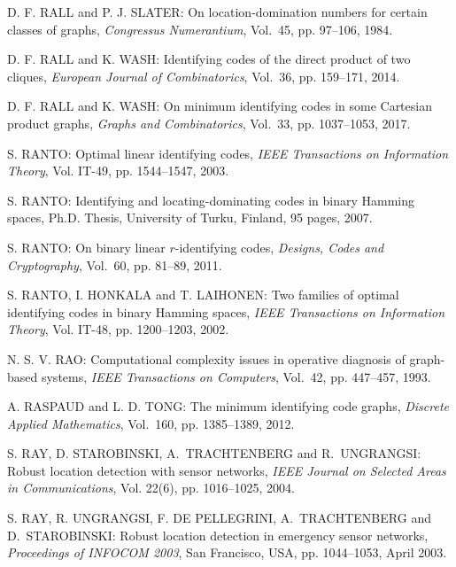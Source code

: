 \begin{thebibliography}{999}
D. F. RALL and P. J. SLATER: On location-domination numbers for certain classes of graphs, {\it Congressus Numerantium}, Vol.~45, pp. 97--106, 1984.

D. F. RALL and K. WASH: Identifying codes of the direct product of two cliques, {\it European Journal of Combinatorics}, Vol.~36, pp. 159--171, 2014.

D. F. RALL and K. WASH: On minimum identifying codes in some Cartesian product graphs, {\it Graphs and Combinatorics}, Vol.~33, pp. 1037--1053, 2017.

S. RANTO: Optimal linear identifying codes, {\it IEEE Transactions on Information Theory}, Vol. IT-49, pp. 1544--1547, 2003.

S. RANTO: Identifying and locating-dominating codes in binary Hamming spaces, Ph.D. Thesis, University of Turku, Finland, 95 pages, 2007.

S. RANTO: On binary linear $r$-identifying codes, {\it Designs, Codes and Cryptography}, Vol.~60, pp. 81--89, 2011.

S. RANTO, I. HONKALA and T. LAIHONEN: Two families of optimal identifying codes in binary Hamming spaces, {\it IEEE Transactions on Information Theory}, Vol. IT-48, pp. 1200--1203, 2002. 

N. S. V. RAO: Computational complexity issues in operative diagnosis of graph-based systems, {\it IEEE Transactions on Computers}, Vol.~42, pp. 447--457, 1993.

A. RASPAUD and L. D. TONG: The minimum identifying code graphs, {\it Discrete Applied Mathematics}, Vol.~160, pp. 1385--1389, 2012.

S. RAY, D. STAROBINSKI, A.~TRACHTENBERG and R.~UNGRANGSI: Robust location detection with sensor networks, {\it IEEE Journal on Selected Areas in Communications}, Vol. 22(6), pp. 1016--1025, 2004.

S. RAY, R. UNGRANGSI, F. DE PELLEGRINI, A.~TRACHTENBERG and D.~STAROBINSKI: Robust location detection in emergency sensor networks, {\it Proceedings of INFOCOM 2003}, San Francisco, USA, pp. 1044--1053, April 2003.


\end{thebibliography}
